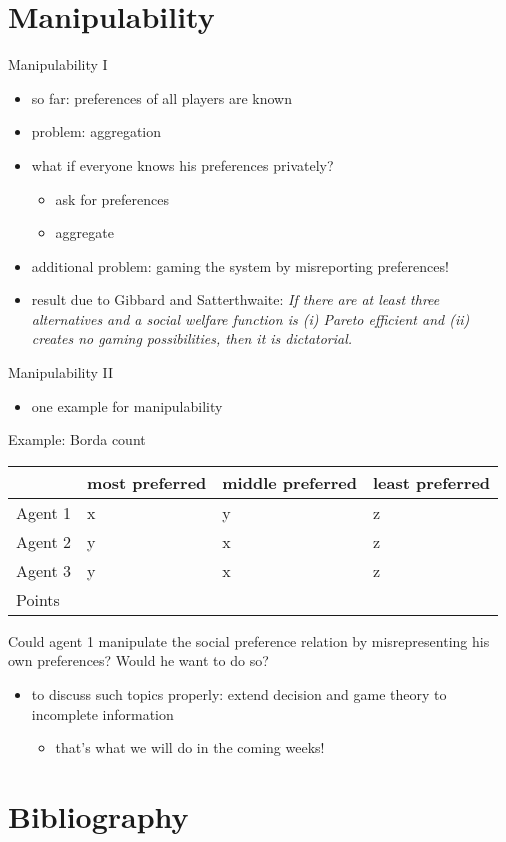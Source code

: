 \documentclass[bigger]{beamer}
\begin{document}
\section{Manipulability}
\label{sec:orgbfd1aab}
\begin{frame}[label={sec:orgae54ad7}]{Manipulability I}
\begin{itemize}
\item so far: preferences of all players are known
\item problem: aggregation
\item what if everyone knows his preferences privately?
\begin{itemize}
\item ask for preferences
\item aggregate
\end{itemize}
\item additional problem: gaming the system by misreporting preferences!
\item result due to Gibbard and Satterthwaite:\linebreak
\emph{If there are at least three alternatives and a social welfare function is (i) Pareto efficient and (ii) creates no gaming possibilities, then it is dictatorial.}
\end{itemize}
\end{frame}

\begin{frame}[label={sec:org153572e}]{Manipulability II}
\begin{itemize}
\item one example for manipulability
\end{itemize}

\begin{block}{Example:   Borda count}
\begin{center}
\begin{tabular}{l|lll}
 & most preferred & middle preferred & least preferred\\
\hline
Agent 1 & x & y & z\\
Agent 2 & y & x & z\\
Agent 3 & y & x & z\\
\hline
Points &  &  & \\
\end{tabular}
\end{center}
Could agent 1 manipulate the social preference relation by misrepresenting his own preferences? Would he want to do so?
\end{block}
\begin{itemize}
\item to discuss such topics properly:\linebreak
extend decision and game theory to incomplete information
\begin{itemize}
\item that's what we will do in the coming weeks!
\end{itemize}
\end{itemize}
\end{frame}


\section{Bibliography}
\label{sec:org5644c75}


\end{document}
